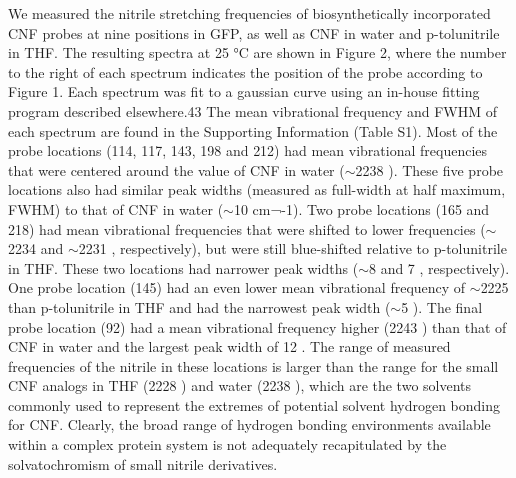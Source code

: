 We measured the nitrile stretching frequencies of biosynthetically incorporated CNF probes at nine positions in GFP, as well as CNF in water and p-tolunitrile in THF.
The resulting spectra at 25 \si{\celsius} are shown in Figure 2, where the number to the right of each spectrum indicates the position of the probe according to Figure 1.
Each spectrum was fit to a gaussian curve using an in-house fitting program described elsewhere.43
The mean vibrational frequency and FWHM of each spectrum are found in the Supporting Information (Table S1).
Most of the probe locations (114, 117, 143, 198 and 212) had mean vibrational frequencies that were centered around the value of CNF in water ($\sim$2238 \si{\wn}).
These five probe locations also had similar peak widths (measured as full-width at half maximum, FWHM) to that of CNF in water ($\sim$10 cm¬-1).
Two probe locations (165 and 218) had mean vibrational frequencies that were shifted to lower frequencies ($\sim$2234 \si{\wn} and $\sim$2231 \si{\wn}, respectively), but were still blue-shifted relative to p-tolunitrile in THF.
These two locations had narrower peak widths ($\sim$8 \si{\wn} and 7 \si{\wn}, respectively).
One probe location (145) had an even lower mean vibrational frequency of $\sim$2225 \si{\wn} than p-tolunitrile in THF and had the narrowest peak width ($\sim$5 \si{\wn}).
The final probe location (92) had a mean vibrational frequency higher (2243 \si{\wn}) than that of CNF in water and the largest peak width of 12 \si{\wn}.
The range of measured frequencies of the nitrile in these locations is larger than the range for the small CNF analogs in THF (2228 \si{\wn}) and water (2238 \si{\wn}), which are the two solvents commonly used to represent the extremes of potential solvent hydrogen bonding for CNF.
Clearly, the broad range of hydrogen bonding environments available within a complex protein system is not adequately recapitulated by the solvatochromism of small nitrile derivatives. 

